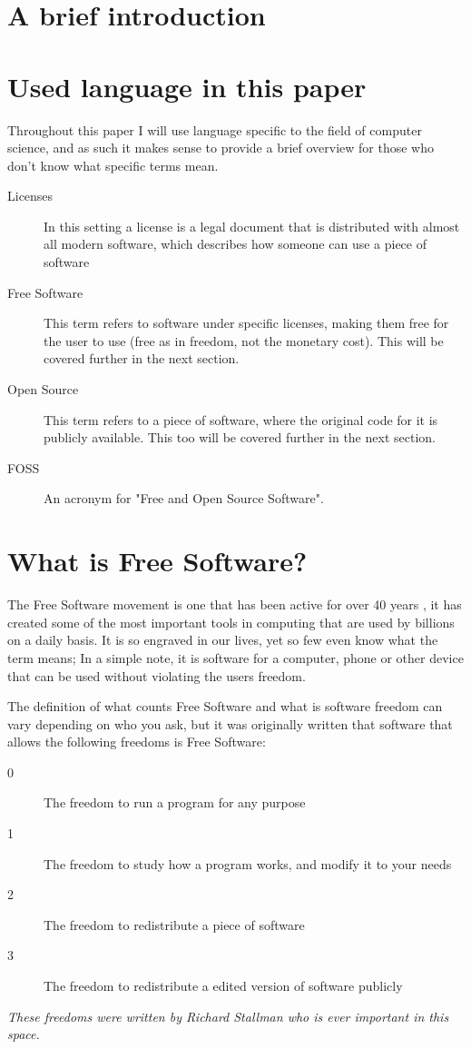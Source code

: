 \documentclass[a4paper,12pt]{article}
\begin{document}
{\setlength{\parindent}{0cm}

\section{A brief introduction}

\section{Used language in this paper}
Throughout this paper I will use language specific to the field of computer science, and as such
it makes sense to provide a brief overview for those who don't know what specific terms mean.

\begin{description}
	\item[Licenses] In this setting a license is a legal document that is distributed with
		almost all modern software, which describes how someone can use a piece of software
	\item[Free Software] This term refers to software under specific licenses, making them 
		free for the user to use (free as in freedom, not the monetary cost). This will
		be covered further in the next section.
	\item[Open Source] This term refers to a piece of software, where the original code for it
		is publicly available. This too will be covered further in the next section.
	\item[FOSS] An acronym for "Free and Open Source Software".
\end{description}

\section{What is Free Software?}
The Free Software movement is one that has been active for over 40 years \cite{GNUmaifesto}, it has
created some of the most important tools in computing that are used by billions on a daily basis. 
It is so engraved in our lives, yet so few even know what the term means; In a simple note, it is
software for a computer, phone or other device that can be used without violating the users 
freedom.

The definition of what counts Free Software and what is software freedom can vary depending on who 
you ask, but it was originally written that software that allows the following freedoms is 
Free Software:

\begin{description}
	\item[0] The freedom to run a program for any purpose
	\item[1] The freedom to study how a program works, and modify it to your needs
	\item[2] The freedom to redistribute a piece of software
	\item[3] The freedom to redistribute a edited version of software publicly
\end{description}
\textit{These freedoms were written by Richard Stallman\cite{FOSSdef} who is ever 
	important in this space.}

}
\end{document}
